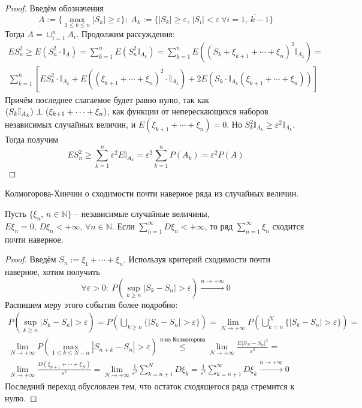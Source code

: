 \begin{proof}
	Введём обозначения 
	\[A := \{\max_{1 \leq k \leq n} |S_k| \geq \varepsilon\};\; A_k := \{|S_k| \geq \varepsilon,\, |S_i| < \varepsilon \: \forall i = \overline{1,\,k-1}\}\]
	Тогда $A = \sqcup_{i = 1}^n A_i$. Продолжим рассуждения:
	\begin{align*}
		ES_n^2 \geq E(S_n^2 \cdot\mathbb{I}_A) = \sum_{k = 1}^n E(S_n^2\mathbb{I}_{A_k}) = \sum_{k = 1}^n E((S_k + \xi_{k + 1} + \cdots + \xi_n)^2\mathbb{I}_{A_k}) = \\
		\sum_{k = 1}^n \left[ES_k^2\cdot\mathbb{I}_{A_k} + E\left((\xi_{k + 1} + \cdots + \xi_n)^2\cdot\mathbb{I}_{A_k}\right) + 2E(S_k\cdot\mathbb{I}_{A_k}(\xi_{k + 1} + \cdots + \xi_n)) \right]
	\end{align*}
	Причём последнее слагаемое будет равно нулю, так как $(S_k\mathbb{I}_{A_k}) \independent (\xi_{k + 1} + \cdots + \xi_n)$, как функции от неперескающихся наборов независимых случайных величин, и $E(\xi_{k + 1} + \cdots + \xi_n) = 0$. Но $S_k^2\mathbb{I}_{A_k} \geq \varepsilon^2\mathbb{I}_{A_k}$. Тогда получим
	\[ES_n^2 \geq \sum_{k = 1}^n\varepsilon^2E\mathbb{I}_{A_k} = \varepsilon^2 \sum_{k = 1}^n P(A_k) = \varepsilon^2 P(A)\]
\end{proof}

\begin{theorem}
	Колмогорова-Хинчин о сходимости почти наверное ряда из случайных величин.

	Пусть $\{\xi_n,\, n \in \mathbb{N}\}$ -- независимые случайные величины, $E\xi_n = 0,\, D\xi_n < +\infty,\, \forall n \in \mathbb{N}$. Если $\sum_{n = 1}^\infty D\xi_n < +\infty$, то ряд $\sum_{n = 1}^\infty \xi_n$ сходится почти наверное.
\end{theorem}

\begin{proof}
	Введём $S_n := \xi_1 + \cdots + \xi_n$. Используя критерий сходимости почти наверное, хотим получить
	\[\forall \varepsilon > 0:\: P\left(\sup_{k \geq n} |S_k - S_n| > \varepsilon\right) \stackrel{n \to +\infty}{\to} 0\]
	Распишем меру этого события более подробно:
	\begin{align*}
		P\left(\sup_{k \geq n} |S_k - S_n| > \varepsilon\right) = P\left(\bigcup_{k \geq n}\{|S_k - S_n| > \varepsilon\}\right) = \lim_{N \to +\infty} P\left(\bigcup_{k = n}^N \{|S_k - S_n| > \varepsilon\}\right) = \\
		\lim_{N \to +\infty} P\left(\max_{1 \leq k \leq N - n} |S_{n + k} - S_n| > \varepsilon\right) \stackrel{\text{н-во Колмогорова}}{\leq} \lim_{N \to +\infty} \frac{E|S_N - S_n|^2}{\varepsilon^2} =\\
		\lim_{N \to +\infty} \frac{D(\xi_{n + 1} + \cdots + \xi_N)}{\varepsilon^2} = \lim_{N \to +\infty} \frac{1}{\varepsilon^2}\sum_{k = n + 1}^N D\xi_k = \frac{1}{\varepsilon^2} \sum_{k = n + 1}^\infty D\xi_k \stackrel{n \to +\infty}{\to} 0
	\end{align*}
	Последний переход обусловлен тем, что остаток сходящегося ряда стремится к нулю.
\end{proof}
